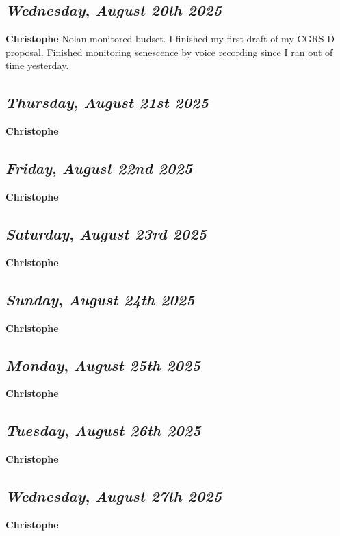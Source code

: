 \def\day{\textit{August 20th 2025}}
\def\weekday{\textit{Wednesday}}
\subsection*{\weekday, \day}
\textbf {Christophe}
Nolan monitored budset. I finished my first draft of my CGRS-D proposal. Finished monitoring senescence by voice recording since I ran out of time yesterday. 

\def\day{\textit{August 21st 2025}}
\def\weekday{\textit{Thursday}}
\subsection*{\weekday, \day}
\textbf {Christophe}

\def\day{\textit{August 22nd 2025}}
\def\weekday{\textit{Friday}}
\subsection*{\weekday, \day}
\textbf {Christophe}

\def\day{\textit{August 23rd 2025}}
\def\weekday{\textit{Saturday}}
\subsection*{\weekday, \day}
\textbf {Christophe}

\def\day{\textit{August 24th 2025}}
\def\weekday{\textit{Sunday}}
\subsection*{\weekday, \day}
\textbf {Christophe}

\def\day{\textit{August 25th 2025}}
\def\weekday{\textit{Monday}}
\subsection*{\weekday, \day}
\textbf {Christophe}

\def\day{\textit{August 26th 2025}}
\def\weekday{\textit{Tuesday}}
\subsection*{\weekday, \day}
\textbf {Christophe}

\def\day{\textit{August 27th 2025}}
\def\weekday{\textit{Wednesday}}
\subsection*{\weekday, \day}
\textbf {Christophe}

